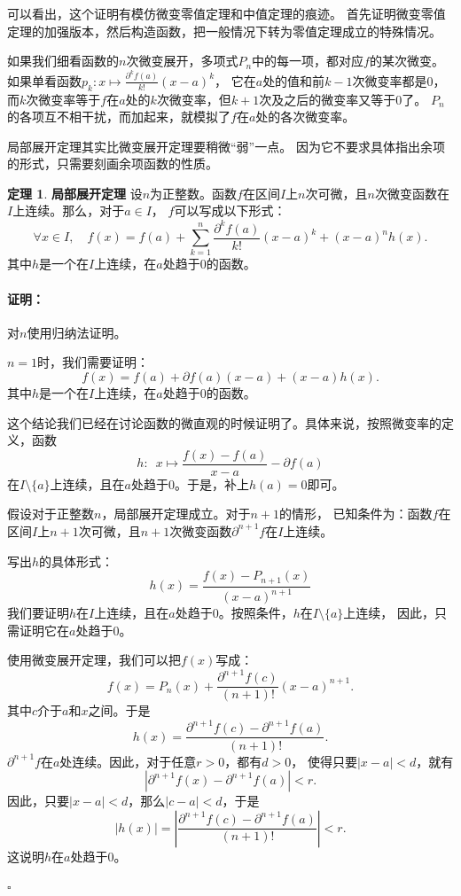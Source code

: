 \documentclass[12pt,UTF8]{ctexbook}
\theoremstyle{definition}
\newtheorem{tm}{定理}[section]
\theoremstyle{plain}
\renewenvironment{proof}{\paragraph{\textbf{证明：}}}{\hfill$\square$}
\begin{document}
\begin{appendix}
可以看出，这个证明有模仿微变零值定理和中值定理的痕迹。
首先证明微变零值定理的加强版本，然后构造函数，把一般情况下转为零值定理成立的特殊情况。

如果我们细看函数的$n$次微变展开，多项式$P_n$中的每一项，都对应$f$的某次微变。
如果单看函数$p_k: x\mapsto \frac{\partial^k f (a)}{k!}(x - a)^k$，
它在$a$处的值和前$k-1$次微变率都是$0$，而$k$次微变率等于$f$在$a$处的$k$次微变率，但$k+1$次及之后的微变率又等于$0$了。
$P_n$的各项互不相干扰，而加起来，就模拟了$f$在$a$处的各次微变率。

局部展开定理其实比微变展开定理要稍微“弱”一点。
因为它不要求具体指出余项的形式，只需要刻画余项函数的性质。

\begin{tm}{\textbf{局部展开定理}}
    设$n$为正整数。函数$f$在区间$I$上$n$次可微，且$n$次微变函数在$I$上连续。那么，对于$a\in I$，
    $f$可以写成以下形式：
    $$ \forall x \in I , \quad f(x) = f(a) + \sum_{k=1}^n \frac{\partial^k f (a)}{k!}(x - a)^k + (x - a)^n h(x). $$
    其中$h$是一个在$I$上连续，在$a$处趋于$0$的函数。
\end{tm}

\begin{proof}
    对$n$使用归纳法证明。

    $n=1$时，我们需要证明：
    $$ f(x) = f(a) + \partial f(a) (x - a) + (x - a) h(x). $$
    其中$h$是一个在$I$上连续，在$a$处趋于$0$的函数。
    
    这个结论我们已经在讨论函数的微直观的时候证明了。具体来说，按照微变率的定义，函数
    $$ h : \,\,\, x \mapsto \frac{f(x) - f(a)}{x - a} - \partial f(a) $$
    在$I\setminus\{a\}$上连续，且在$a$处趋于$0$。于是，补上$h(a) = 0$即可。

    假设对于正整数$n$，局部展开定理成立。对于$n+1$的情形，
    已知条件为：函数$f$在区间$I$上$n+1$次可微，且$n+1$次微变函数$\partial^{n+1} f$在$I$上连续。
    
    写出$h$的具体形式：
    $$ h(x) = \frac{f(x) - P_{n+1}(x)}{(x - a)^{n+1}} $$
    我们要证明$h$在$I$上连续，且在$a$处趋于$0$。按照条件，$h$在$I\setminus\{a\}$上连续，
    因此，只需证明它在$a$处趋于$0$。

    使用微变展开定理，我们可以把$f(x)$写成：
    $$ f(x) = P_n(x) + \frac{\partial^{n+1} f(c)}{(n + 1)!}(x - a)^{n+1}. $$
    其中$c$介于$a$和$x$之间。于是
    $$ h(x) = \frac{\partial^{n+1} f(c) - \partial^{n+1} f(a)}{(n + 1)!}. $$
    $\partial^{n+1} f$在$a$处连续。因此，对于任意$r>0$，都有$d > 0$，
    使得只要$|x - a| < d$，就有
    $$ \left| \partial^{n+1} f(x) - \partial^{n+1} f(a) \right| < r. $$
    因此，只要$|x - a| < d$，那么$|c - a| < d$，于是
    $$ |h(x)| = \left| \frac{\partial^{n+1} f(c) - \partial^{n+1} f(a)}{(n + 1)!} \right| < r .$$
    这说明$h$在$a$处趋于$0$。


\end{proof}
\end{appendix}
\end{document}
